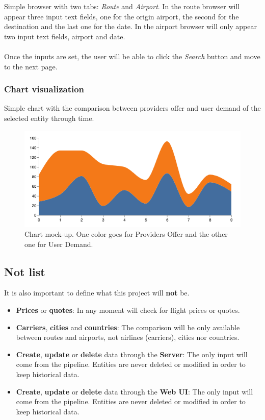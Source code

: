 Simple browser with two tabs: \textit{Route} and \textit{Airport}. In the route browser will appear three input text fields, one for the origin airport, the second for the destination and the last one for the date. In the airport browser will only appear two input text fields, airport and date.
\\\\
Once the inputs are set, the user will be able to click the \textit{Search} button and move to the next page.

\subsubsection*{Chart visualization} \label{chart_visualization}

Simple chart with the comparison between providers offer and user demand of the selected entity through time.

\begin{figure}[H]
\centering
\includegraphics[scale=0.4]{resources/stacked-chart-example01.png}
\caption{Chart mock-up. One color goes for Providers Offer and the other one for User Demand.}
\end{figure}

\subsection{Not list} \label{not_list}

It is also important to define what this project will \textbf{not} be.

\begin{itemize}
  \item \textbf{Prices} or \textbf{quotes}: In any moment will check for flight prices or quotes.
  \item \textbf{Carriers}, \textbf{cities} and \textbf{countries}: The comparison will be only available between routes and airports, not airlines (carriers), cities nor countries.
  \item \textbf{Create}, \textbf{update} or \textbf{delete} data through the \textbf{Server}: The only input will come from the pipeline. Entities are never deleted or modified in order to keep historical data.
  \item \textbf{Create}, \textbf{update} or \textbf{delete} data through the \textbf{Web UI}: The only input will come from the pipeline. Entities are never deleted or modified in order to keep historical data.
\end{itemize}

